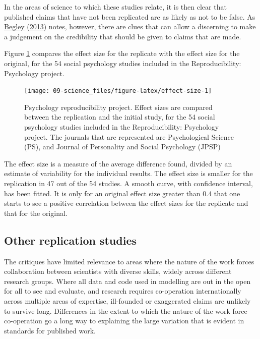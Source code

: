 \documentclass[
  10pt,
  b5paper]{book}
\begin{document}
In the areas of science to which these studies relate,
it is then clear that published claims that have not
been replicated are as likely as not to be false. As
\protect\hyperlink{ref-r2_begley_2013}{Begley} (\protect\hyperlink{ref-r2_begley_2013}{2013}) notes, however, there are clues that
can allow a discerning to make a judgement on the
credibility that should be given to claims that are
made.

Figure \ref{fig:effect-size} compares the effect size
for the replicate with the effect size for the original,
for the 54 social psychology studies included in the
Reproducibility: Psychology project.

\begin{figure}[H]

{\centering \texttt{[image: 09-science\_files/figure-latex/effect-size-1]} 

}

\caption{Psychology reproducibility project. Effect sizes are
compared between the replication and the initial study, for the 
54 social psychology studies included in the Reproducibility:
Psychology project. The journals that are represented are 
Psychological Science (PS), and Journal of Personality and 
Social Psychology (JPSP)}\label{fig:effect-size}
\end{figure}

The effect size is a measure of the average difference found,
divided by an estimate of variability for the individual
results. The effect size is smaller for the replication in 47
out of the 54 studies. A smooth curve, with confidence interval,
has been fitted. It is only for an original effect size
greater than 0.4 that one starts to see a positive correlation
between the effect sizes for the replicate and that for the
original.

\hypertarget{other-replication-studies}{%
\subsection*{Other replication studies}\label{other-replication-studies}}

The critiques have limited relevance to areas where the nature
of the work forces collaboration between scientists with
diverse skills, widely across different research groups.
Where all data and code used in modelling are out in the open
for all to see and evaluate, and research requires co-operation
internationally across multiple areas of expertise, ill-founded
or exaggerated claims are unlikely to survive long. Differences
in the extent to which the nature of the work force co-operation
go a long way to explaining the large variation that is evident
in standards for published work.
\end{document}
